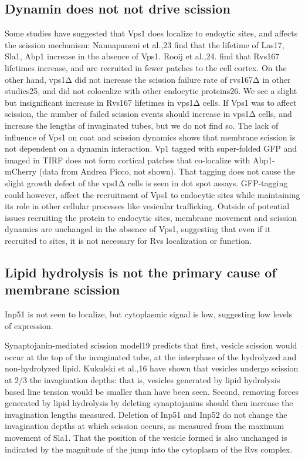 \subsection{Dynamin does not not drive scission}
Some studies have suggested that Vps1 does localize to endoytic sites, and affects the scission mechanism: Nannapaneni et al.,23 find that the lifetime of Las17, Sla1, Abp1 increase in the absence of Vps1. Rooij et al.,24. find that Rvs167 lifetimes increase, and are recruited in fewer patches to the cell cortex. On the other hand, vps1Δ did not increase the scission failure rate of rvs167Δ in other studies25, and did not colocalize with other endocytic proteins26. We see a slight but insignificant increase in Rvs167 lifetimes in vps1Δ cells. If Vps1 was to affect scission, the number of failed scission events should increase in vps1Δ cells, and increase the lengths of invaginated tubes, but we do not find so. The lack of influence of Vps1 on coat and scission dynamics shows that membrane scission is not dependent on a dynamin interaction. Vp1 tagged with super-folded GFP and imaged in TIRF does not form cortical patches that co-localize with Abp1-mCherry (data from Andrea Picco, not shown). That tagging does not cause the slight growth defect of the vps1Δ cells is seen in dot spot assays. GFP-tagging could however, affect the recruitment of Vps1 to endocytic sites while maintaining its role in other cellular processes like vesicular trafficking. Outside of potential issues recruiting the protein to endocytic sites, membrane movement and scission dynamics are unchanged in the absence of Vps1, suggesting that even if it recruited to sites, it is not necessary for Rvs localization or function. 


\subsection{Lipid hydrolysis is not the primary cause of membrane scission}
Inp51 is not seen to localize, but cytoplasmic signal is low, suggesting low levels of expression. 

Synaptojanin-mediated scission model19 predicts that first, vesicle scission would occur at the top of the invaginated tube, at the interphase of the hydrolyzed and non-hydrolyzed lipid. Kukulski et al.,16 have shown that vesicles undergo scission at 2/3 the invagination depths: that is, vesicles generated by lipid hydrolysis based line tension would be smaller than have been seen. Second, removing forces generated by lipid hydrolysis by deleting synaptojanins should then increase the invagination lengths measured. Deletion of Inp51 and Inp52 do not change the invagination depths at which scission occurs, as measured from the maximum movement of Sla1. That the position of the vesicle formed is also unchanged is indicated by the magnitude of the jump into the cytoplasm of the Rvs complex. 

